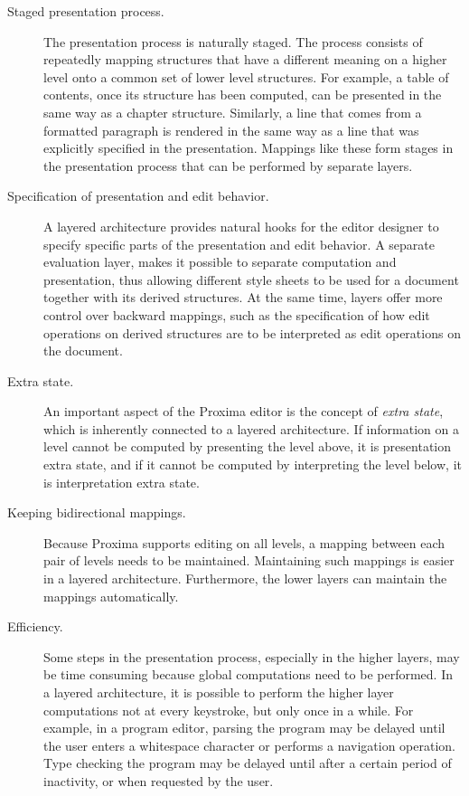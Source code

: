 \begin{description}

\item[Staged presentation process.]
The presentation process is naturally staged. The process consists of repeatedly mapping  structures that have a different meaning on a higher level onto a common set of lower level structures. For example, a table of contents, once its structure has been computed, can be presented in the same way as a chapter structure. Similarly, a line that comes from a formatted paragraph is rendered in the same way as a line that was explicitly specified in the presentation. Mappings like these form stages in the presentation process that can be performed by separate layers.

\item[Specification of presentation and edit behavior.]
A layered architecture provides natural hooks for the editor designer to specify specific parts of the presentation and edit behavior. A separate evaluation layer, makes it possible to separate computation and presentation, thus allowing different style sheets to be used for a document together with its derived structures. At the same time, layers offer more control over backward mappings, such as the specification of how edit operations on derived structures are to be interpreted as edit operations on the document.

\item[Extra state.]
An important aspect of the Proxima editor is the concept of {\em extra state}, which is inherently connected to a layered architecture. If information on a level cannot be computed by presenting the level above, it is presentation extra state, and if it cannot be computed by interpreting the level below, it is interpretation extra state.

\item[Keeping bidirectional mappings.]
Because Proxima supports editing on all levels, a mapping between each pair of levels needs to be maintained. Maintaining such mappings is easier in a layered architecture. Furthermore, the lower layers can maintain the mappings automatically.

\item[Efficiency.]
Some steps in the presentation process, especially in the higher layers, may be time consuming because global computations need to be performed. In a layered architecture, it is possible to perform the higher layer computations not at every keystroke, but only once in a while. For example, in a program editor, parsing the program may be delayed until the user enters a whitespace character or performs a navigation operation. Type checking the program may be delayed until after a certain period of inactivity, or when requested by the user.
\end{description}

